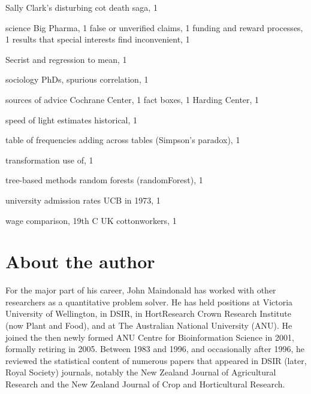 \documentclass[
  10pt,
  b5paper]{book}
\begin{document}
\begin{theindex}
  \indexspace

  \item Sally Clark's disturbing cot death saga, 1
  \item science
    \subitem Big Pharma, 1
    \subitem false or unverified claims, 1
    \subitem funding and reward processes, 1
    \subitem results that special interests find inconvenient, 1
  \item Secrist and regression to mean, 1
  \item sociology PhDs, spurious correlation, 1
  \item sources of advice
    \subitem Cochrane Center, 1
    \subitem fact boxes, 1
    \subitem Harding Center, 1
  \item speed of light estimates
    \subitem historical, 1

  \indexspace

  \item table of frequencies
    \subitem adding across tables (Simpson's paradox), 1
  \item transformation
    \subitem use of, 1
  \item tree-based methods
    \subitem random forests (randomForest), 1

  \indexspace

  \item university admission rates
    \subitem UCB in 1973, 1

  \indexspace

  \item wage comparison, 19th C UK cottonworkers, 1

\end{theindex}

\thispagestyle{empty}

\hypertarget{author}{%
\chapter*{About the author}\label{author}}

For the major part of his career, John Maindonald has worked with other
researchers as a quantitative problem solver.
He has held positions at Victoria University of Wellington, in DSIR, in HortResearch Crown Research Institute (now Plant and Food), and at The Australian National University (ANU).
He joined the then newly formed ANU Centre for Bioinformation Science in 2001, formally retiring in 2005.
Between 1983 and 1996, and occasionally after 1996, he reviewed the statistical content of numerous papers that appeared in DSIR (later, Royal Society) journals, notably the New Zealand Journal of Agricultural Research and the New Zealand Journal of Crop and Horticultural Research.
\end{document}
